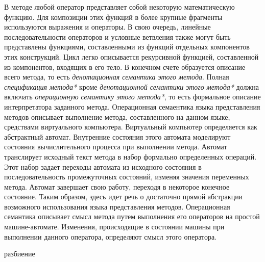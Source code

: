 В методе любой оператор представляет собой некоторую математическую функцию. Для композиции этих функций в более
крупные фрагменты используются выражения и операторы. В свою очередь, линейные последовательности операторов
и условные ветвления также могут быть представлены функциями, составленными из функций отдельных компонентов этих
конструкций. Цикл легко описывается рекурсивной функцией, составленной из компонентов, входящих в его тело. В конечном
счете образуется описание всего метода, то есть \textit{денотационная семантика этого метода}. Полная
\textit{спецификация метода*} кроме \textit{денотационной семантики этого метода*} должна включать \textit{операционную
семантику этого метода*}, то есть формальное описание интерпретатора заданного метода. Операционная семаентика языка
представления методов описывает выполнение метода, составленного на данном языке, средствами виртуального компьютера.
Виртуальный компьютер определяется как абстрактный автомат. Внутренние состояния этого автомата моделируют состояния
вычислительного процесса при выполнении метода. Автомат транслирует исходный текст метода в набор формально определенных
операций. Этот набор задает переходы автомата из исходного состояния в последовательность промежуточных состояний,
изменяя значения переменных метода. Автомат завершает свою работу, переходя в некоторое конечное состояние.
Таким образом, здесь идет речь о достаточно прямой абстракции возможного использования языка представления методов.
Операционная семантика описывает смысл метода путем выполнения его операторов на простой машине-автомате.
Изменения, происходящие в состоянии машины при выполнении данного оператора, определяют смысл этого оператора.

\begin{SCn}
\begin{scnrelfromset}{разбиение}
    \begin{scnindent}
    \end{scnindent}
    \begin{scnindent}
    \end{scnindent}
\end{scnrelfromset}
\end{SCn}

